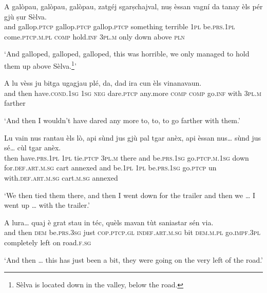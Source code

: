 \begin{linenumbers}
\gll  A galòpau, galòpau, galòpau, zatgéj sgarṣchajval, nuṣ èssan vagní da tanay èls pér gjù ṣur Sèlva.  \\ 
and gallop.\textsc{ptcp} gallop.\textsc{ptcp} gallop.\textsc{ptcp} something terrible \textsc{1pl} be.\textsc{prs.1pl} come.\textsc{ptcp.m.pl}   \textsc{comp} hold.\textsc{inf} \textsc{3pl.m} only down above \textsc{pln}  \\
\end{linenumbers}
\medskip
\glt `And galloped, galloped, galloped, this was horrible, we only managed to hold them up above Sèlva.\footnote{Sèlva is located down in the valley, below the road.}'
\medskip

\begin{linenumbers}
\gll  A lu vèss ju bitga ugagjau plé, da, dad ira cun èls vinanavaun.\\
and then have.\textsc{cond.1sg} \textsc{1sg} \textsc{neg} dare.\textsc{ptcp} any.more  \textsc{comp} \textsc{comp} go.\textsc{inf} with \textsc{3pl.m} farther   \\
\end{linenumbers}
\medskip
\glt `And then I wouldn’t have dared any more to, to, to go farther with them.'
\medskip

\begin{linenumbers}
\gll Lu vain nus rantau èls lò, api sùnd jus gjù pal tgar anèx, api èssan nus… sùnd jus sé… cùl tgar anèx.   \\
then have.\textsc{prs.1pl} \textsc{1pl} tie.\textsc{ptcp} \textsc{3pl.m} there and be.\textsc{prs.1sg} go.\textsc{ptcp.m.1sg} down for.\textsc{def.art.m.sg} cart annexed  and be.\textsc{1pl} \textsc{1pl} be.\textsc{prs.1sg} go.\textsc{ptcp} un with.\textsc{def.art.m.sg} cart.\textsc{m.sg} annexed \\
\end{linenumbers}
\medskip
\glt `We then tied them there, and then I went down for the trailer and then we … I went up … with the trailer.'
\medskip

\begin{linenumbers}
\gll A lura… quaj è grat stau in téc, quèls mavan tùt saniastar sén via.   \\
and then  \textsc{dem} be.\textsc{prs.3sg} just \textsc{cop.ptcp.gl} \textsc{indef.art.m.sg} bit \textsc{dem.m.pl} go.\textsc{impf.3pl} completely left on road.\textsc{f.sg}  \\
\end{linenumbers}
\medskip
\glt `And then … this has just been a bit, they were going on the very left of the road.'\medskip

